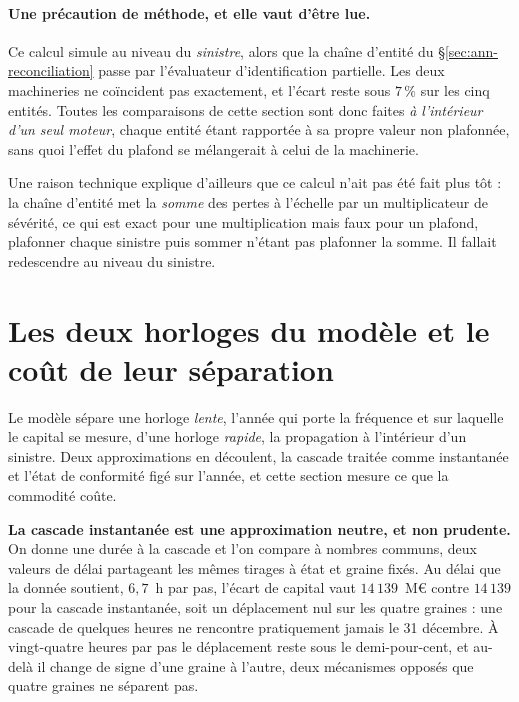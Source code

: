 \paragraph{Une précaution de méthode, et elle vaut d'être lue.} Ce calcul simule au niveau du
\emph{sinistre}, alors que la chaîne d'entité du \S\ref{sec:ann-reconciliation} passe par
l'évaluateur d'identification partielle. Les deux machineries ne coïncident pas exactement, et
l'écart reste sous $7\,\%$ sur les cinq entités. Toutes les comparaisons de cette section sont
donc faites \emph{à l'intérieur d'un seul moteur}, chaque entité étant rapportée à sa propre
valeur non plafonnée, sans quoi l'effet du plafond se mélangerait à celui de la machinerie.

Une raison technique explique d'ailleurs que ce calcul n'ait pas été fait plus tôt : la chaîne
d'entité met la \emph{somme} des pertes à l'échelle par un multiplicateur de sévérité, ce qui est
exact pour une multiplication mais faux pour un plafond, plafonner chaque sinistre puis
sommer n'étant pas plafonner la somme. Il fallait redescendre au niveau du sinistre.

\section{Les deux horloges du modèle et le coût de leur séparation}
\label{sec:ann-horloges}

Le modèle sépare une horloge \emph{lente}, l'année qui porte la fréquence et sur laquelle le
capital se mesure, d'une horloge \emph{rapide}, la propagation à l'intérieur d'un sinistre. Deux
approximations en découlent, la cascade traitée comme instantanée et l'état de conformité figé sur
l'année, et cette section mesure ce que la commodité coûte.

\textbf{La cascade instantanée est une approximation neutre, et non prudente.} On donne une durée à
la cascade et l'on compare à nombres communs, deux valeurs de délai partageant les mêmes tirages à
état et graine fixés. Au délai que la donnée soutient, $6{,}7$~h par pas, l'écart de capital vaut
$14\,139$~M\euro{} contre $14\,139$ pour la cascade instantanée, soit un déplacement nul sur les
quatre graines : une cascade de quelques heures ne rencontre pratiquement jamais le 31 décembre. À
vingt-quatre heures par pas le déplacement reste sous le demi-pour-cent, et au-delà il change de
signe d'une graine à l'autre, deux mécanismes opposés que quatre graines ne séparent pas.

